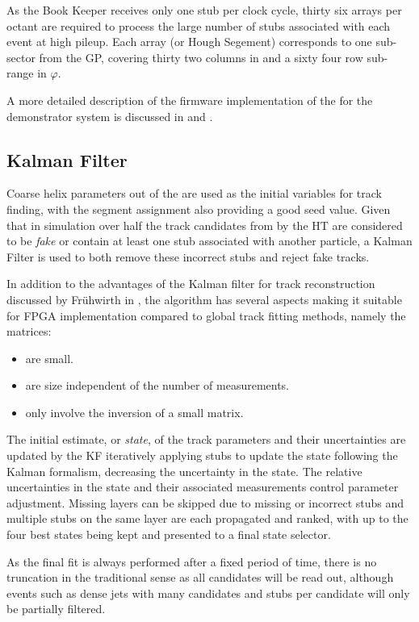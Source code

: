 As the Book Keeper receives only one stub per clock cycle, thirty six arrays per octant are required to process the large number of stubs associated with each event at high pileup. Each array (or Hough Segement) corresponds to one sub-sector from the GP, covering thirty two columns in \qpt and a sixty four row sub-range in $\varphi$.

A more detailed description of the firmware implementation of the \HT for the demonstrator system is discussed in \cite{IEEE} and \cite{TmttNote}.

\subsection{Kalman Filter}
Coarse \rphi helix parameters out of the \HT are used as the initial variables for track finding, with the segment assignment also providing a good seed value. Given that in simulation over half the track candidates from by the HT are considered to be \textit{fake} or contain at least one stub associated with another particle, a Kalman Filter is used to both remove these incorrect stubs and reject fake tracks. 

In addition to the advantages of the Kalman filter for track reconstruction discussed by Fr{\"u}hwirth in \cite{Fruhwirth:1987fm}, the algorithm has several aspects making it suitable for FPGA implementation compared to global track fitting methods, namely the matrices:

\begin{itemize}
\item {are small.}
\item {are size independent of the number of measurements.}
\item {only involve the inversion of a small matrix.}
\end{itemize}

The initial estimate, or \textit{state}, of the track parameters and their uncertainties are updated by the KF iteratively applying stubs to update the state following the Kalman formalism, decreasing the uncertainty in the state. The relative uncertainties in the state and their associated measurements control parameter adjustment. Missing layers can be skipped due to missing or incorrect stubs and multiple stubs on the same layer are each propagated and ranked, with up to the four best states being kept and presented to a final state selector.

As the final fit is always performed after a fixed period of time, there is no truncation in the traditional sense as all candidates will be read out, although events such as dense jets with many candidates	and stubs per candidate will only be partially filtered.

